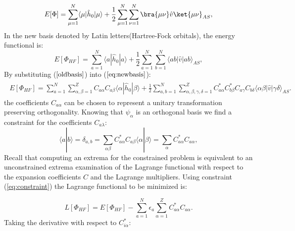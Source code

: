 \documentclass[twoside,english]{uiofysmaster}
\begin{document}
\begin{equation}
E[\Phi] = \sum_{\mu=1}^N \langle \mu | \hat{h}_0 | \mu \rangle + \frac{1}{2}\sum_{\mu=1}^N\sum_{\nu=1}^N \bra{\mu \nu}\hat{v}\ket{\mu \nu}_{AS},
\label{eq:funAS}
\end{equation}
In the new basis denoted by Latin letters(Hartree-Fock orbitals), the energy functional is:
\begin{equation}
E[\Phi_{HF}] = \sum_{a=1}^N \langle a | \hat{h}_0 | a \rangle + \frac{1}{2}\sum_{a=1}^N\sum_{b=1}^N \langle ab|\hat{v}|ab\rangle_{AS},
\label{eq:newbasis}
\end{equation}
By substituting ($\ref{oldbasis}$) into ($\ref{eq:newbasis}$):
\begin{align}
\begin{split}
E[\Phi_{HF}] = \sum_{a=1}^N \sum_{\alpha ,\beta=1}^ZC_{a\alpha} C_{a\beta}\langle  \alpha | \hat{h}_0 | \beta \rangle + 
\frac{1}{2}\sum_{a,b=1}^N  \sum_{\alpha,\beta,\gamma,\delta=1}^Z C_{a\alpha }^*C_{b\beta}^* C_{a \gamma} C_{b \delta} \langle \alpha  \beta |\hat{v}|
 \gamma \delta \rangle_{AS}.
\label{eq:newbasisintro}
\end{split}
\end{align}
the coefficients $C_{a \alpha}$ can be chosen to represent a unitary transformation preserving orthogonality. Knowing that $\psi_{\alpha}$ is an orthogonal basis we find a constraint for the coefficients $C_{a \lambda}$:
\begin{equation}
\langle a | b \rangle=\delta_{a,b}=\sum_{\alpha\beta} C^*_{a\alpha}C_{a\beta}\langle \alpha|\beta \rangle = \sum_{\alpha} C^*_{a\alpha}C_{a\alpha},
\label{eq:constraint}
\end{equation}
Recall that computing an extrema for the constrained problem is equivalent to an unconstrained extrema examination of the Lagrange functional with respect to the expansion coefficients $C$ and the Lagrange multipliers.
Using constraint (\ref{eq:constraint}) the Lagrange functional to be minimized is:

\begin{equation}
L[\Phi_{HF}] = E[\Phi_{HF}] - \sum_{a=1}^N\epsilon_a\sum_{\alpha=1}^Z C^*_{a\alpha}C_{a\alpha}.
\end{equation}
Taking the derivative with respect to $C^*_{i\alpha}$:
\end{document}
